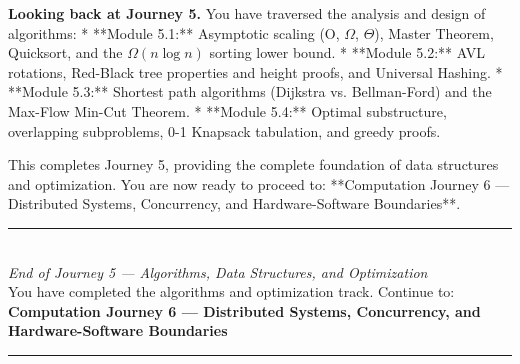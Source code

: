 \documentclass[12pt, a4paper]{book}
\begin{document}
\medskip
\noindent\textbf{Looking back at Journey 5.}
You have traversed the analysis and design of algorithms:
* **Module 5.1:** Asymptotic scaling (O, $\Omega$, $\Theta$), Master Theorem, Quicksort, and the $\Omega(n \log n)$ sorting lower bound.
* **Module 5.2:** AVL rotations, Red-Black tree properties and height proofs, and Universal Hashing.
* **Module 5.3:** Shortest path algorithms (Dijkstra vs. Bellman-Ford) and the Max-Flow Min-Cut Theorem.
* **Module 5.4:** Optimal substructure, overlapping subproblems, 0-1 Knapsack tabulation, and greedy proofs.

This completes Journey 5, providing the complete foundation of data structures and optimization. You are now ready to proceed to: **Computation Journey 6 --- Distributed Systems, Concurrency, and Hardware-Software Boundaries**.

\vspace{1.4cm}
\begin{center}
{\color{JourneyColor}\rule{0.5\linewidth}{0.8pt}}\\[6pt]
{\small\color{JourneyColor}\textit{End of Journey 5 --- Algorithms, Data Structures, and Optimization}}\\[4pt]
{\small\color{JourneyColor}You have completed the algorithms and optimization track. Continue to: \textbf{Computation Journey 6 --- Distributed Systems, Concurrency, and Hardware-Software Boundaries}}\\[6pt]
{\color{JourneyColor}\rule{0.5\linewidth}{0.8pt}}
\end{center}
\end{document}
